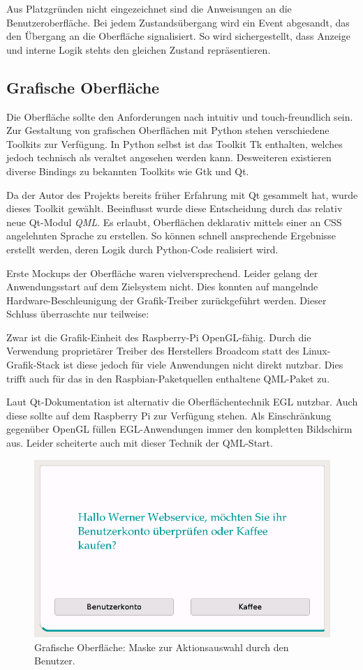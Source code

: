 \documentclass[11pt,a4paper]{IEEEtran}
\begin{document}
Aus Platzgründen nicht eingezeichnet sind die Anweisungen an die
Benutzeroberfläche. Bei jedem Zustandsübergang wird ein Event abgesandt, das 
den Übergang an die Oberfläche signalisiert. So wird sichergestellt, dass
Anzeige und interne Logik stehts den gleichen Zustand repräsentieren.

\subsection{Grafische Oberfläche} 
\label{sec:gui}

Die Oberfläche sollte den Anforderungen nach intuitiv und touch-freundlich
sein. Zur Gestaltung von grafischen Oberflächen mit Python stehen verschiedene
Toolkits zur Verfügung. In Python selbst ist das Toolkit Tk enthalten, welches
jedoch technisch als veraltet angesehen werden kann. Desweiteren existieren
diverse Bindings zu bekannten Toolkits wie Gtk und Qt. 

Da der Autor des Projekts bereits früher Erfahrung mit Qt gesammelt hat, wurde 
dieses Toolkit gewählt. Beeinflusst wurde diese Entscheidung durch das relativ
neue Qt-Modul \emph{QML}. Es erlaubt, Oberflächen deklarativ mittels einer an
CSS angelehnten Sprache zu erstellen. So können schnell ansprechende Ergebnisse
erstellt werden, deren Logik durch Python-Code realisiert wird.

Erste Mockups der Oberfläche waren vielversprechend. Leider gelang der 
Anwendungsstart auf dem Zielsystem nicht. Dies konnten auf mangelnde 
Hardware-Beschleunigung der Grafik-Treiber zurückgeführt werden. Dieser Schluss
überraschte nur teilweise: 

Zwar ist die Grafik-Einheit des Raspberry-Pi OpenGL-fähig. Durch die Verwendung
proprietärer Treiber des Herstellers Broadcom statt des Linux-Grafik-Stack ist
diese jedoch für viele Anwendungen nicht direkt nutzbar. Dies trifft auch für
das in den Raspbian-Paketquellen enthaltene QML-Paket zu.

Laut Qt-Dokumentation ist alternativ die Oberflächentechnik EGL nutzbar. Auch
diese sollte auf dem Raspberry Pi zur Verfügung stehen. Als Einschränkung 
gegenüber OpenGL füllen EGL-Anwendungen immer den kompletten Bildschirm aus.
Leider scheiterte auch mit dieser Technik der QML-Start.

\begin{figure}[htb]
    \centering
    \includegraphics[width=.9\columnwidth]{images/screenshot}
    \caption{Grafische Oberfläche: Maske zur Aktionsauswahl durch den Benutzer.}
    \label{fig:qt}
\end{figure}
\end{document}
